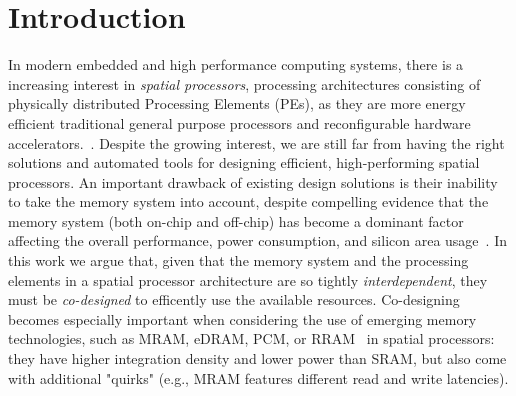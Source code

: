 \section{Introduction}
In modern embedded and high performance computing systems, there is a increasing interest in \textit{spatial processors}, processing architectures consisting of physically distributed Processing Elements (PEs), as they are more energy efficient traditional general purpose processors and reconfigurable hardware accelerators.~\cite{parashar2014efficient,prabhakar2017plasticine,budiu2004spatial,streamproc2019,cerqueira2020catena,7284058,8686088}. %
Despite the growing interest, we are still far from having the right  solutions and automated tools for designing efficient, high-performing spatial processors. An important drawback of existing design solutions is their inability to take the memory system into account, despite compelling evidence that the memory system (both on-chip and off-chip) has become a dominant factor affecting the overall performance, power consumption, and silicon area usage~\cite{williams2009roofline,dayarathna2015data,oh2009analytical}.
In this work we argue that, given that the memory system and the processing elements in a spatial processor architecture are so tightly \textit{interdependent}, they must be \textit{co-designed} to efficently use the available resources. Co-designing becomes especially important when considering the use of emerging memory technologies, such as MRAM, eDRAM, PCM, or RRAM~\cite{mem2016} in spatial processors: they have higher integration density and lower power than SRAM, but also come with additional "quirks" (e.g., MRAM features different read and write latencies).

%

